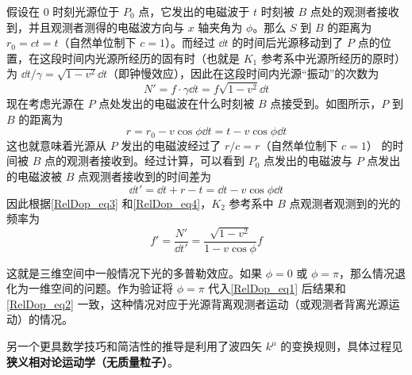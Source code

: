 假设在 $0$ 时刻光源位于 $P_0$ 点，它发出的电磁波于 $t$ 时刻被 $B$ 点处的观测者接收到，并且观测者测得的电磁波方向与 $x$ 轴夹角为 $\phi$。那么 $S$ 到 $B$ 的距离为 $r_0=ct=t$（自然单位制下 $c=1$）。而经过 $\dd t$ 的时间后光源移动到了 $P$ 点的位置，在这段时间内光源所经历的固有时（也就是 $K_1$ 参考系中光源所经历的原时）为 $\dd t/\gamma=\sqrt{1-v^2}\dd t$（即钟慢效应），因此在这段时间内光源“振动”的次数为
\begin{equation}\label{RelDop_eq3}
N'=f\cdot \gamma \dd t = f\sqrt{1-v^2}\dd t
\end{equation}
现在考虑光源在 $P$ 点处发出的电磁波在什么时刻被 $B$ 点接受到。如图所示，$P$ 到 $B$ 的距离为
\begin{equation}
r=r_0-v\cos\phi \dd t=t-v\cos\phi\dd t
\end{equation}
这也就意味着光源从 $P$ 发出的电磁波经过了 $r/c=r$（自然单位制下 $c=1$） 的时间被 $B$ 点的观测者接收到。经过计算，可以看到 $P_0$ 点发出的电磁波与 $P$ 点发出的电磁波被 $B$ 点观测者接收到的时间差为
\begin{equation}\label{RelDop_eq4}
\dd t' = \dd t + r - t = \dd t -v\cos\phi\dd t
\end{equation}
因此根据\autoref{RelDop_eq3} 和\autoref{RelDop_eq4}，$K_2$ 参考系中 $B$ 点观测者观测到的光的频率为
\begin{equation}\label{RelDop_eq1}
f'=\frac{N'}{\dd t'}=\frac{\sqrt{1-v^2}}{1-v\cos\phi} f
\end{equation}

这就是三维空间中一般情况下光的多普勒效应。如果 $\phi=0$ 或 $\phi=\pi$，那么情况退化为一维空间的问题。作为验证将 $\phi=\pi$ 代入\autoref{RelDop_eq1} 后结果和\autoref{RelDop_eq2} 一致，这种情况对应于光源背离观测者运动（或观测者背离光源运动）的情况。

另一个更具数学技巧和简洁性的推导是利用了波四矢 $k^\mu$ 的变换规则，具体过程见\textbf{狭义相对论运动学（无质量粒子）}。